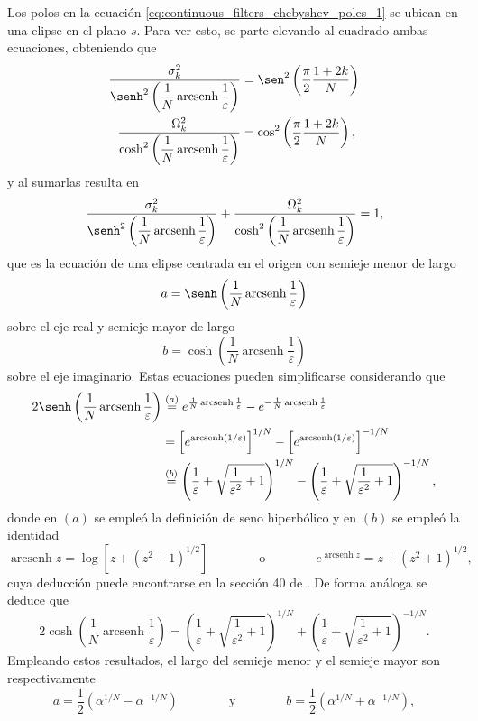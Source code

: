 \documentclass[a4paper]{report}
\DeclareMathOperator{\arcsenh}{arcsenh}
\begin{document}
Los polos en la ecuación \ref{eq:continuous_filters_chebyshev_poles_1} se ubican en una elipse en el plano \(s\). Para ver esto, se parte elevando al cuadrado ambas ecuaciones, obteniendo que
\[
 \begin{aligned}
  \dfrac{\sigma^2_k}{\senh^2\left(\dfrac{1}{N}\arcsenh\dfrac{1}{\varepsilon}\right)}&=\sen^2\left(\frac{\pi}{2}\frac{1+2k}{N}\right)\\
  \dfrac{\Omega^2_k}{\cosh^2\left(\dfrac{1}{N}\arcsenh\dfrac{1}{\varepsilon}\right)}&=\cos^2\left(\frac{\pi}{2}\frac{1+2k}{N}\right),
 \end{aligned}
\]
y al sumarlas resulta en
\[
 \dfrac{\sigma^2_k}{\senh^2\left(\dfrac{1}{N}\arcsenh\dfrac{1}{\varepsilon}\right)}+\dfrac{\Omega^2_k}{\cosh^2\left(\dfrac{1}{N}\arcsenh\dfrac{1}{\varepsilon}\right)}=1,
\]
que es la ecuación de una elipse centrada en el origen con semieje menor de largo 
\[
 a=\senh\left(\dfrac{1}{N}\arcsenh\dfrac{1}{\varepsilon}\right)
\]
sobre el eje real y semieje mayor de largo 
\[
 b=\cosh\left(\dfrac{1}{N}\arcsenh\dfrac{1}{\varepsilon}\right)
\]
sobre el eje imaginario. Estas ecuaciones pueden simplificarse considerando que 
\begin{align*}
 2\senh\left(\dfrac{1}{N}\arcsenh\dfrac{1}{\varepsilon}\right)&\overset{(a)}{=}e^{\frac{1}{N}\arcsenh\frac{1}{\varepsilon}}-e^{-\frac{1}{N}\arcsenh\frac{1}{\varepsilon}}\\ 
 &=\left[e^{\arcsenh(1/\varepsilon)}\right]^{1/N}-\left[e^{\arcsenh(1/\varepsilon)}\right]^{-1/N}\\ 
 &\overset{(b)}{=}\left(\frac{1}{\varepsilon}+\sqrt{\frac{1}{\varepsilon^2}+1}\right)^{1/N}-\left(\frac{1}{\varepsilon}+\sqrt{\frac{1}{\varepsilon^2}+1}\right)^{-1/N},
\end{align*}
donde en \((a)\) se empleó la definición de seno hiperbólico y en \((b)\) se empleó la identidad
\[
 \arcsenh z=\log[z+(z^2+1)^{1/2}]
 \qquad\qquad\textrm{o}\qquad\qquad
 e^{\arcsenh z}=z+(z^2+1)^{1/2},
\]
cuya deducción puede encontrarse en la sección 40 de \cite{brown2013complex}. De forma análoga se deduce que 
\[
 2\cosh\left(\dfrac{1}{N}\arcsenh\dfrac{1}{\varepsilon}\right)=\left(\frac{1}{\varepsilon}+\sqrt{\frac{1}{\varepsilon^2}+1}\right)^{1/N}+\left(\frac{1}{\varepsilon}+\sqrt{\frac{1}{\varepsilon^2}+1}\right)^{-1/N}.
\]
Empleando estos resultados, el largo del semieje menor y el semieje mayor son respectivamente
\begin{equation}\label{eq:continuous_filters_chebyshev_poles_elipse_axis}
 a=\frac{1}{2}\left(\alpha^{1/N}-\alpha^{-1/N}\right)
 \qquad\qquad\textrm{y}\qquad\qquad
 b=\frac{1}{2}\left(\alpha^{1/N}+\alpha^{-1/N}\right), 
\end{equation}
\end{document}
